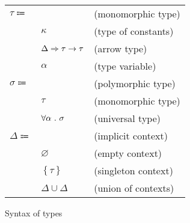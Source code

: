 \documentclass[acmlarge]{acmart}
\begin{document}
  \begin{figure}[h!]
    \begin{mdframed}

      \begin{tabular}{l l l}
        $\tau \Coloneqq $ & & (monomorphic type) \\
        & $\kappa$ & (type of constants) \\
        & $\Delta \Rightarrow \tau \rightarrow \tau$ & (arrow type) \\
        & $\alpha$ & (type variable) \\
        $\sigma \Coloneqq $ & & (polymorphic type) \\
        & $\tau$ & (monomorphic type) \\
        & $\forall \alpha \ . \ \sigma$ & (universal type) \\
        $\Delta \Coloneqq $ & & (implicit context) \\
        & $\varnothing$ & (empty context) \\
        & $\left\{ \tau \right\}$ & (singleton context) \\
        & $\Delta \cup \Delta$ & (union of contexts)
      \end{tabular}

    \end{mdframed}
    \caption{Syntax of types}
    \label{fig:types_syntax}
  \end{figure}
\end{document}
